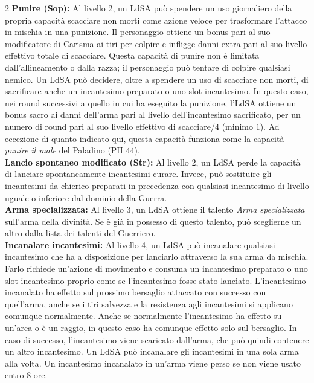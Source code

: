 \documentclass[10pt, a4paper]{report}
\begin{document}
\begin{multicols}{2}
\textbf{Punire (Sop):} Al livello 2, un LdSA può spendere un uso giornaliero della propria capacità scacciare non morti come azione veloce per trasformare l’attacco in mischia in una punizione. Il personaggio ottiene un bonus pari al suo modificatore di Carisma ai tiri per colpire e infligge danni extra pari al suo livello effettivo totale di scacciare. Questa capacità di punire non è limitata dall'allineamento o dalla razza; il personaggio può tentare di colpire qualsiasi nemico. Un LdSA può decidere, oltre a spendere un uso di scacciare non morti, di sacrificare anche un incantesimo preparato o uno slot incantesimo. In questo caso, nei round successivi a quello in cui ha eseguito la punizione, l’LdSA ottiene un bonus sacro ai danni dell’arma pari al livello dell’incantesimo sacrificato, per un numero di round pari al suo livello effettivo di scacciare/$4$ (minimo $1$). Ad eccezione di quanto indicato qui, questa capacità funziona come la capacità \textit{punire il male} del Paladino (PH $44$).\\

\textbf{Lancio spontaneo modificato (Str):} Al livello 2, un LdSA perde la capacità di lanciare spontaneamente incantesimi curare. Invece, può sostituire gli incantesimi da chierico preparati in precedenza con qualsiasi incantesimo di livello uguale o inferiore dal dominio della Guerra.\\

\textbf{Arma specializzata:} Al livello 3, un LdSA ottiene il talento \textit{Arma specializzata} sull’arma della divinità. Se è già in possesso di questo talento, può sceglierne un altro dalla lista dei talenti del Guerriero.\\

\textbf{Incanalare incantesimi:} Al livello 4, un LdSA può incanalare qualsiasi incantesimo che ha a disposizione per lanciarlo attraverso la sua arma da mischia. Farlo richiede un'azione di movimento e consuma un incantesimo preparato o uno slot incantesimo proprio come se l'incantesimo fosse stato lanciato. L'incantesimo incanalato ha effetto sul prossimo bersaglio attaccato con successo con quell'arma, anche se i tiri salvezza e la resistenza agli incantesimi si applicano comunque normalmente. Anche se normalmente l'incantesimo ha effetto su un'area o è un raggio, in questo caso ha comunque effetto solo sul bersaglio. In caso di successo, l'incantesimo viene scaricato dall'arma, che può quindi contenere un altro incantesimo. Un LdSA può incanalare gli incantesimi in una sola arma alla volta. Un incantesimo incanalato in un'arma viene perso se non viene usato entro 8 ore.\\


\end{multicols}
\end{document}
